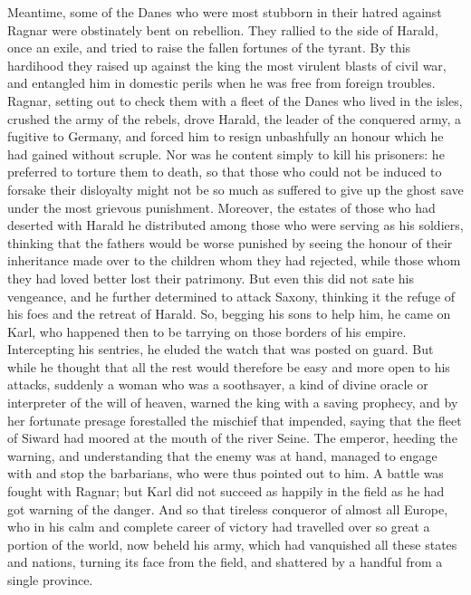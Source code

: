 \documentclass[10pt,a4paper]{report}
\begin{document}
Meantime, some of the Danes who were most stubborn in their hatred against Ragnar were obstinately bent on rebellion. They rallied to the side of Harald, once an exile, and tried to raise the fallen fortunes of the tyrant. By this hardihood they raised up against the king the most virulent blasts of civil war, and entangled him in domestic perils when he was free from foreign troubles. Ragnar, setting out to check them with a fleet of the Danes who lived in the isles, crushed the army of the rebels, drove Harald, the leader of the conquered army, a fugitive to Germany, and forced him to resign unbashfully an honour which he had gained without scruple. Nor was he content simply to kill his prisoners: he preferred to torture them to death, so that those who could not be induced to forsake their disloyalty might not be so much as suffered to give up the ghost save under the most grievous punishment. Moreover, the estates of those who had deserted with Harald he distributed among those who were serving as his soldiers, thinking that the fathers would be worse punished by seeing the honour of their inheritance made over to the children whom they had rejected, while those whom they had loved better lost their patrimony. But even this did not sate his vengeance, and he further determined to attack Saxony, thinking it the refuge of his foes and the retreat of Harald. So, begging his sons to help him, he came on Karl, who happened then to be tarrying on those borders of his empire. Intercepting his sentries, he eluded the watch that was posted on guard. But while he thought that all the rest would therefore be easy and more open to his attacks, suddenly a woman who was a soothsayer, a kind of divine oracle or interpreter of the will of heaven, warned the king with a saving prophecy, and by her fortunate presage forestalled the mischief that impended, saying that the fleet of Siward had moored at the mouth of the river Seine. The emperor, heeding the warning, and understanding that the enemy was at hand, managed to engage with and stop the barbarians, who were thus pointed out to him. A battle was fought with Ragnar; but Karl did not succeed as happily in the field as he had got warning of the danger. And so that tireless conqueror of almost all Europe, who in his calm and complete career of victory had travelled over so great a portion of the world, now beheld his army, which had vanquished all these states and nations, turning its face from the field, and shattered by a handful from a single province.\\
\end{document}
